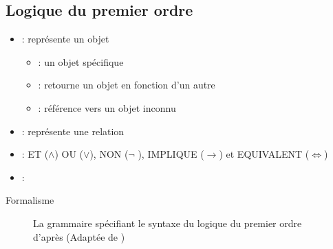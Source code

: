 \documentclass{KodeBook}
\begin{document}
\subsection{Logique du premier ordre}

\begin{itemize}
	\item {} : représente un objet
	\begin{itemize}
		\item {} : un objet spécifique
		
		
		\item {} : retourne un objet en fonction d'un autre
		
		
		\item {} : référence vers un objet inconnu 
		
		
	\end{itemize}
	\item {} : représente une relation 
	
	
	\item {} : ET ($ \wedge $) OU ($ \vee $), NON ($ \neg $ ), IMPLIQUE ($\rightarrow$) et EQUIVALENT ($ \Leftrightarrow $)
	
	
	\item {} : 
	
	
\end{itemize}

Formalisme
\begin{figure}
	\caption{La grammaire spécifiant le syntaxe du logique du premier ordre d'après \cite{2019-jurafsky-martin} (Adaptée de \cite{2002-russell-norvig})}
\end{figure}
\end{document}

